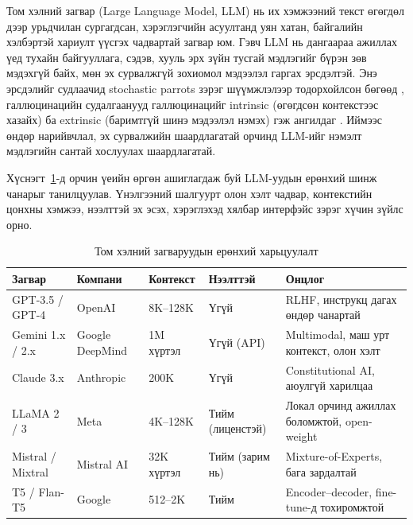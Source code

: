 Том хэлний загвар (Large Language Model, LLM) нь их хэмжээний текст өгөгдөл дээр урьдчилан сургагдсан, хэрэглэгчийн асуултанд уян хатан, байгалийн хэлбэртэй хариулт үүсгэх чадвартай загвар юм. Гэвч LLM нь дангаараа ажиллах үед тухайн байгууллага, сэдэв, хууль эрх зүйн тусгай мэдлэгийг бүрэн зөв мэдэхгүй байх, мөн эх сурвалжгүй зохиомол мэдээлэл гаргах эрсдэлтэй. Энэ эрсдэлийг судлаачид stochastic parrots зэрэг шүүмжлэлээр тодорхойлсон бөгөөд \cite{llm_limitations}, галлюцинацийн судалгаанууд галлюцинацийг intrinsic (өгөгдсөн контекстээс хазайх) ба extrinsic (баримтгүй шинэ мэдээлэл нэмэх) гэж ангилдаг \cite{ji_hallucination_survey, hallucination_survey}. Иймээс өндөр нарийвчлал, эх сурвалжийн шаардлагатай орчинд LLM-ийг нэмэлт мэдлэгийн сантай хослуулах шаардлагатай.

Хүснэгт~\ref{tab:llm-landscape}-д орчин үеийн өргөн ашиглагдаж буй LLM-уудын ерөнхий шинж чанарыг танилцуулав. Үнэлгээний шалгуурт олон хэлт чадвар, контекстийн цонхны хэмжээ, нээлттэй эх эсэх, хэрэглэхэд хялбар интерфэйс зэрэг хүчин зүйлс орно.

\begin{table}[H]
\centering
\small
\renewcommand{\arraystretch}{1.2}
\begin{tabular} {|p{2.7cm}|p{2.0cm}|p{1.8cm}|p{1.9cm}|p{4.6cm}|}
\hline
\textbf{Загвар} & \textbf{Компани} & \textbf{Контекст} & \textbf{Нээлттэй} & \textbf{Онцлог} \\ \hline
GPT-3.5 / GPT-4~\cite{gpt3,instruct_gpt} & OpenAI & 8K--128K & Үгүй & RLHF, инструкц дагах өндөр чанартай \\ \hline
Gemini 1.x / 2.x~\cite{gemini_report} & Google DeepMind & 1M хүртэл & Үгүй (API) & Multimodal, маш урт контекст, олон хэлт \\ \hline
Claude 3.x & Anthropic & 200K & Үгүй & Constitutional AI, аюулгүй харилцаа \\ \hline
LLaMA 2 / 3 & Meta & 4K--128K & Тийм (лиценстэй) & Локал орчинд ажиллах боломжтой, open-weight \\ \hline
Mistral / Mixtral & Mistral AI & 32K хүртэл & Тийм (зарим нь) & Mixture-of-Experts, бага зардалтай \\ \hline
T5 / Flan-T5~\cite{t5} & Google & 512--2K & Тийм & Encoder--decoder, fine-tune-д тохиромжтой \\ \hline
\end{tabular}
\caption[Том хэлний загваруудын харьцуулалт]{Том хэлний загваруудын ерөнхий харьцуулалт}
\label{tab:llm-landscape}
\end{table}

